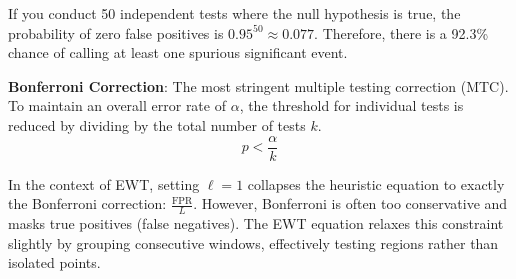 \documentclass[11pt,a4paper]{article}
\begin{document}
If you conduct 50 independent tests where the null hypothesis is true, the probability of zero false positives is $0.95^{50} \approx 0.077$. Therefore, there is a 92.3\% chance of calling at least one spurious significant event. 

\begin{important}
    \textbf{Bonferroni Correction}: The most stringent multiple testing correction (MTC). To maintain an overall error rate of $\alpha$, the threshold for individual tests is reduced by dividing by the total number of tests $k$.
    \[ p < \frac{\alpha}{k} \]
\end{important}

In the context of EWT, setting $\ell=1$ collapses the heuristic equation to exactly the Bonferroni correction: $\frac{\mathrm{FPR}}{L}$. However, Bonferroni is often too conservative and masks true positives (false negatives). The EWT equation relaxes this constraint slightly by grouping consecutive windows, effectively testing regions rather than isolated points.
\end{document}

